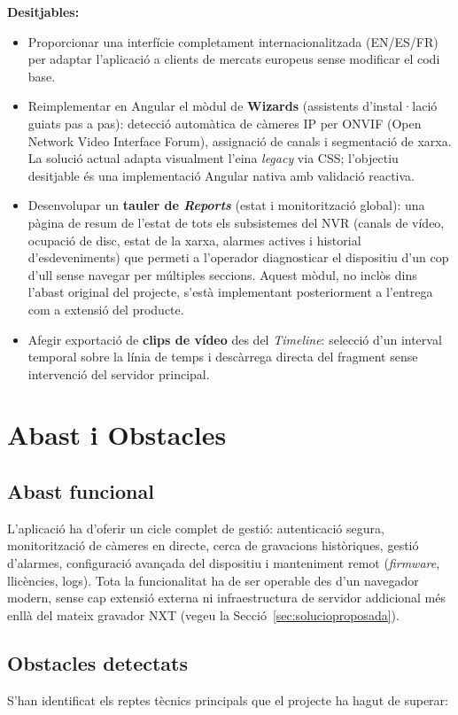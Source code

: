 \noindent\textbf{Desitjables:}
\begin{itemize}
  \item Proporcionar una interfície completament internacionalitzada (EN/ES/FR) per adaptar l'aplicació a clients de mercats europeus sense modificar el codi base.
  \item Reimplementar en Angular el mòdul de \textbf{Wizards} (assistents d'instal·lació guiats pas a pas): detecció automàtica de càmeres IP per ONVIF (Open Network Video Interface Forum), assignació de canals i segmentació de xarxa. La solució actual adapta visualment l'eina \textit{legacy} via CSS; l'objectiu desitjable és una implementació Angular nativa amb validació reactiva.
  \item Desenvolupar un \textbf{tauler de \textit{Reports}} (estat i monitorització global): una pàgina de resum de l'estat de tots els subsistemes del NVR (canals de vídeo, ocupació de disc, estat de la xarxa, alarmes actives i historial d'esdeveniments) que permeti a l'operador diagnosticar el dispositiu d'un cop d'ull sense navegar per múltiples seccions. Aquest mòdul, no inclòs dins l'abast original del projecte, s'està implementant posteriorment a l'entrega com a extensió del producte.
  \item Afegir exportació de \textbf{clips de vídeo} des del \textit{Timeline}: selecció d'un interval temporal sobre la línia de temps i descàrrega directa del fragment sense intervenció del servidor principal.
\end{itemize}

\section{Abast i Obstacles}
\subsection{Abast funcional}
L'aplicació ha d'oferir un cicle complet de gestió: autenticació segura, monitorització de càmeres en directe, cerca de gravacions històriques, gestió d'alarmes, configuració avançada del dispositiu i manteniment remot (\textit{firmware}, llicències, logs). Tota la funcionalitat ha de ser operable des d'un navegador modern, sense cap extensió externa ni infraestructura de servidor addicional més enllà del mateix gravador NXT (vegeu la Secció~\ref{sec:solucioproposada}).

\subsection{Obstacles detectats}
S'han identificat els reptes tècnics principals que el projecte ha hagut de superar:


